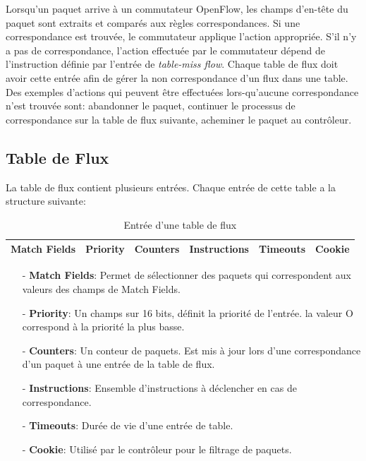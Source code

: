 Lorsqu’un paquet arrive à un commutateur OpenFlow, les champs d’en-tête du paquet sont extraits et comparés aux règles correspondances. Si une correspondance est trouvée, le commutateur applique l’action appropriée. S’il n’y a pas de correspondance, l’action effectuée par le commutateur dépend de l’instruction définie par l’entrée de \textit{ table-miss flow}. Chaque table de flux doit avoir cette entrée afin de gérer la non correspondance d’un flux dans une table. Des exemples d’actions qui peuvent être effectuées lors-qu’aucune correspondance n’est trouvée sont: abandonner le paquet, continuer le processus de correspondance sur la table de flux suivante, acheminer le paquet au contrôleur. 

\subsection{Table de Flux}
La table de flux contient plusieurs entrées. Chaque entrée de cette table a la structure suivante:\\
\begin{table}[h]
\begin{center}
\begin{tabular}{ | c | c | c | c | c | c |}
\hline
\rowcolor[rgb]{0.85,0.85,0.85}
Match Fields & Priority & Counters & Instructions & Timeouts & Cookie\\
\hline
\end{tabular}
\caption{Entrée d'une table de flux}
\end{center}
\end{table}
\begin{itemize}

\item[-]\textbf{Match Fields}: Permet de sélectionner des paquets qui correspondent aux valeurs des champs de Match Fields.
\item[-]\textbf{Priority}: Un champs sur 16 bits, définit la priorité de l'entrée. la valeur O correspond à la priorité la plus basse.
\item[-]\textbf{Counters}: Un conteur de paquets. Est mis à jour lors d'une correspondance d'un paquet à une entrée de la table de flux. 
\item[-]\textbf{Instructions}: Ensemble d'instructions à déclencher en cas de correspondance. 
\item[-]\textbf{Timeouts}: Durée de vie d'une entrée de table.
\item[-]\textbf{Cookie}: Utilisé par le contrôleur pour le filtrage de paquets.\\
\end{itemize}

